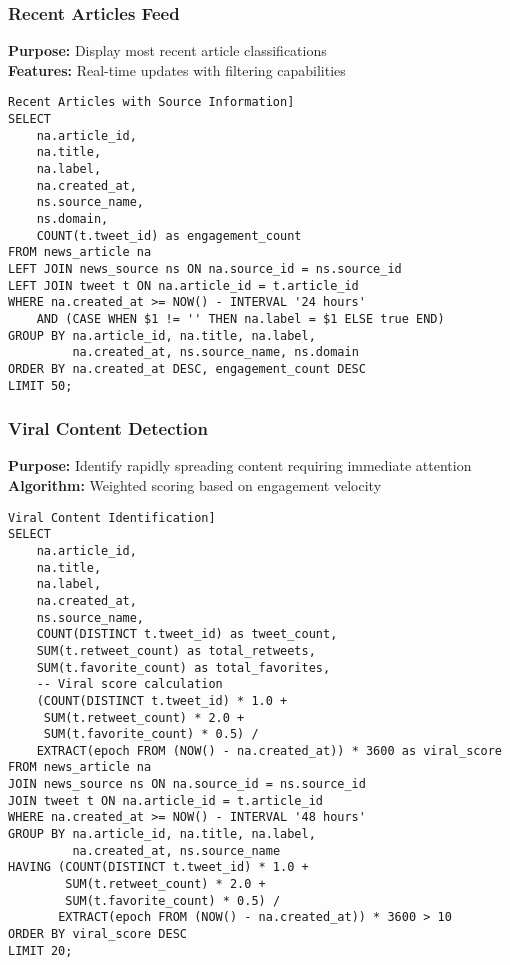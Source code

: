 \documentclass[11pt,a4paper]{article}
\begin{document}
\subsubsection{Recent Articles Feed}
\textbf{Purpose:} Display most recent article classifications\\
\textbf{Features:} Real-time updates with filtering capabilities

\begin{verbatim}Recent Articles with Source Information]
SELECT 
    na.article_id,
    na.title,
    na.label,
    na.created_at,
    ns.source_name,
    ns.domain,
    COUNT(t.tweet_id) as engagement_count
FROM news_article na
LEFT JOIN news_source ns ON na.source_id = ns.source_id
LEFT JOIN tweet t ON na.article_id = t.article_id
WHERE na.created_at >= NOW() - INTERVAL '24 hours'
    AND (CASE WHEN $1 != '' THEN na.label = $1 ELSE true END)
GROUP BY na.article_id, na.title, na.label, 
         na.created_at, ns.source_name, ns.domain
ORDER BY na.created_at DESC, engagement_count DESC
LIMIT 50;
\end{verbatim}

\subsubsection{Viral Content Detection}
\textbf{Purpose:} Identify rapidly spreading content requiring immediate attention\\
\textbf{Algorithm:} Weighted scoring based on engagement velocity

\begin{verbatim}Viral Content Identification]
SELECT 
    na.article_id,
    na.title,
    na.label,
    na.created_at,
    ns.source_name,
    COUNT(DISTINCT t.tweet_id) as tweet_count,
    SUM(t.retweet_count) as total_retweets,
    SUM(t.favorite_count) as total_favorites,
    -- Viral score calculation
    (COUNT(DISTINCT t.tweet_id) * 1.0 + 
     SUM(t.retweet_count) * 2.0 + 
     SUM(t.favorite_count) * 0.5) / 
    EXTRACT(epoch FROM (NOW() - na.created_at)) * 3600 as viral_score
FROM news_article na
JOIN news_source ns ON na.source_id = ns.source_id
JOIN tweet t ON na.article_id = t.article_id
WHERE na.created_at >= NOW() - INTERVAL '48 hours'
GROUP BY na.article_id, na.title, na.label, 
         na.created_at, ns.source_name
HAVING (COUNT(DISTINCT t.tweet_id) * 1.0 + 
        SUM(t.retweet_count) * 2.0 + 
        SUM(t.favorite_count) * 0.5) / 
       EXTRACT(epoch FROM (NOW() - na.created_at)) * 3600 > 10
ORDER BY viral_score DESC
LIMIT 20;
\end{verbatim}
\end{document}
